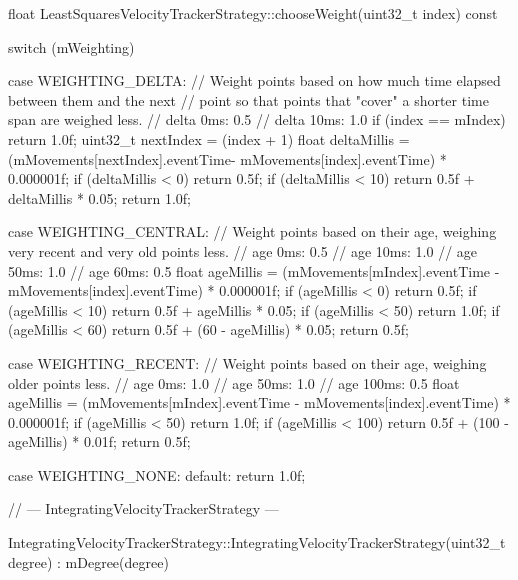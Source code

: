 float LeastSquaresVelocityTrackerStrategy::chooseWeight(uint32_t index) const {
    switch (mWeighting) {
        case WEIGHTING_DELTA: {
            // Weight points based on how much time elapsed between them and the next
            // point so that points that "cover" a shorter time span are weighed less.
            //   delta  0ms: 0.5
            //   delta 10ms: 1.0
            if (index == mIndex) {
                return 1.0f;
            }
            uint32_t nextIndex = (index + 1) %
            float deltaMillis = (mMovements[nextIndex].eventTime- mMovements[index].eventTime)
            * 0.000001f;
            if (deltaMillis < 0) {
                return 0.5f;
            }
            if (deltaMillis < 10) {
                return 0.5f + deltaMillis * 0.05;
            }
            return 1.0f;
        }
            
        case WEIGHTING_CENTRAL: {
            // Weight points based on their age, weighing very recent and very old points less.
            //   age  0ms: 0.5
            //   age 10ms: 1.0
            //   age 50ms: 1.0
            //   age 60ms: 0.5
            float ageMillis = (mMovements[mIndex].eventTime - mMovements[index].eventTime)
            * 0.000001f;
            if (ageMillis < 0) {
                return 0.5f;
            }
            if (ageMillis < 10) {
                return 0.5f + ageMillis * 0.05;
            }
            if (ageMillis < 50) {
                return 1.0f;
            }
            if (ageMillis < 60) {
                return 0.5f + (60 - ageMillis) * 0.05;
            }
            return 0.5f;
        }
            
        case WEIGHTING_RECENT: {
            // Weight points based on their age, weighing older points less.
            //   age   0ms: 1.0
            //   age  50ms: 1.0
            //   age 100ms: 0.5
            float ageMillis = (mMovements[mIndex].eventTime - mMovements[index].eventTime)
            * 0.000001f;
            if (ageMillis < 50) {
                return 1.0f;
            }
            if (ageMillis < 100) {
                return 0.5f + (100 - ageMillis) * 0.01f;
            }
            return 0.5f;
        }
            
        case WEIGHTING_NONE:
        default:
            return 1.0f;
    }
}


// --- IntegratingVelocityTrackerStrategy ---

IntegratingVelocityTrackerStrategy::IntegratingVelocityTrackerStrategy(uint32_t degree) :
mDegree(degree) {
}

